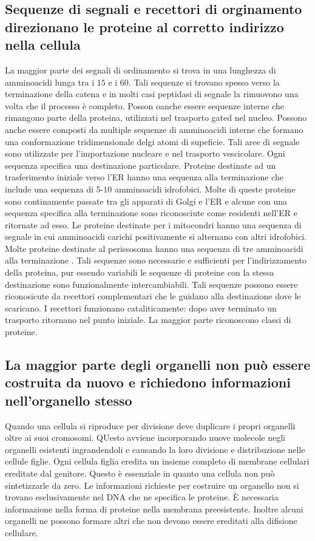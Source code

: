 \subsection{Sequenze di segnali e recettori di orginamento direzionano le proteine al corretto indirizzo nella cellula}
La maggior parte dei segnali di ordinamento si trova in una lunghezza di amminoacidi lunga tra i $15$ e i $60$. Tali sequenze si trovano spesso verso la terminazione  della catena
e in molti casi peptidasi di segnale la rimuovono una volta che il processo \`e completo. Posson oanche essere sequenze interne che rimangono parte della proteina, utilizzati nel 
trasporto gated nel nucleo. Possono anche essere composti da multiple sequenze di amminoacidi interne che formano una conformazione tridimensionale delgi atomi di supeficie. Tali 
aree di segnale sono utilizzate per l'importazione nucleare e nel trasporto vescicolare. Ogni sequenza specifica una destinazione particolare. Proteine destinate ad un trasferimento 
iniziale verso l'ER hanno una sequenza alla terminazione  che include una sequenza di $5$-$10$ amminoacidi idrofobici. Molte di queste proteine sono continamente passate tra gli
apparati di Golgi e l'ER e alcune con una sequenza specifica alla terminazione  sono riconosciute come residenti nell'ER e ritornate ad esso. Le proteine destinate per i mitocondri
hanno una sequenza di segnale in cui amminoacidi carichi positivamente si alternano con altri idrofobici. Molte proteine destinate al perissosoma hanno una sequenza di tre amminoacidi
alla terminazione . Tali sequenze sono necessarie e sufficienti per l'indirizzamento della proteina, pur essendo variabili le sequenze di proteine con la stessa destinazione sono
funzionalmente intercambiabili. Tali sequenze possono essere riconosicute da recettori complementari che le guidano alla destinazione dove le scaricano. I recettori funzionano 
cataliticamente: dopo aver terminato un trasporto ritornano nel punto iniziale. La maggior parte riconoscono classi di proteine. 
\subsection{La maggior parte degli organelli non pu\`o essere costruita da nuovo e richiedono informazioni nell'organello stesso}
Quando una cellula si riproduce per divisione deve duplicare i propri organelli oltre ai suoi cromosomi. QUesto avviene incorporando nuove molecole negli organelli esistenti 
ingrandendoli e causando la loro divisione e distribuzione nelle cellule figlie. Ogni cellula figlia eredita un insieme completo di membrane cellulari ereditate dal genitore. Questo \`e
essenziale in quanto una cellula non pu\`o sintetizzarle da zero. Le informazioni richieste per costruire un organello non si trovano esclusivamente nel DNA che ne specifica le proteine.
\`E necessaria informazione nella forma di proteine nella membrana preesistente. Inoltre alcuni organelli ne possono formare altri che non devono essere ereditati alla difisione 
cellulare. 
